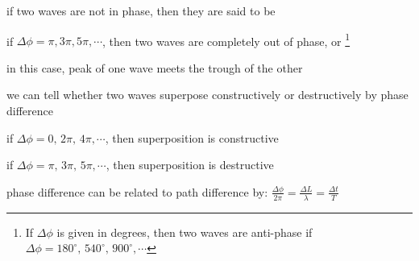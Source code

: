 \cmt if two waves are not in phase, then they are said to be 

\cmt if $\Delta \phi = \pi, 3\pi, 5\pi, \cdots$, then two waves are completely out of phase, or \footnote{If $\Delta \phi$ is given in degrees, then two waves are anti-phase if $\Delta \phi = 180^\circ, \, 540^\circ, \, 900^\circ, \cdots$}

in this case, peak of one wave meets the trough of the other


\cmt we can tell whether two waves superpose constructively or destructively by phase difference

{
	
	\centering
	\vspace*{6pt}
	\begin{tcolorbox}[colframe=orange, colback=yellow!30, width=0.65\textwidth]
		\setlength{\baselineskip}{\baselineskip}%
		
		\centering
		
		if ${\Delta \phi = 0, \, 2\pi, \,4\pi, \cdots}$, then superposition is constructive
		
		if ${\Delta \phi = \pi, \, 3\pi, \, 5\pi, \cdots}$, then superposition is destructive
		
	\end{tcolorbox}\vspace*{-4pt}
	
}






\newpage

\cmt phase difference can be related to path difference by: $ \boxed{ \frac{\Delta \phi}{2\pi} = \frac{\Delta L}{\lambda} = \frac{\Delta t}{T} } $


